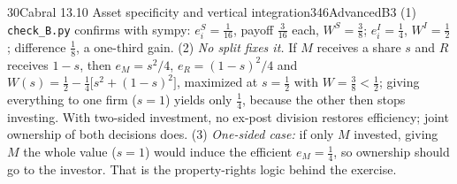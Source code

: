 \begin{exsol}{30}{Cabral 13.10 Asset specificity and vertical integration}{346}{Advanced}{B3}
\verify (1) \texttt{check\_B.py} confirms with sympy: $e_i^S = \tfrac1{16}$, payoff
$\tfrac3{16}$ each, $W^S = \tfrac38$; $e_i^I = \tfrac14$, $W^I = \tfrac12$; difference
$\tfrac18$, a one-third gain. (2) \emph{No split fixes it.} If $M$ receives a share $s$ and $R$
receives $1-s$, then $e_M = s^2/4$, $e_R = (1-s)^2/4$ and
$W(s) = \tfrac12 - \tfrac14\big[s^2 + (1-s)^2\big]$, maximized at $s=\tfrac12$ with
$W = \tfrac38 < \tfrac12$; giving everything to one firm ($s=1$) yields only $\tfrac14$, because
the other then stops investing. With two-sided investment, no ex-post division restores
efficiency; joint ownership of both decisions does. (3) \emph{One-sided case:} if only $M$
invested, giving $M$ the whole value ($s=1$) would induce the efficient $e_M = \tfrac14$, so
ownership should go to the investor. That is the property-rights logic behind the exercise.

\end{exsol}
